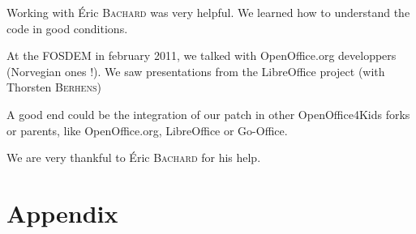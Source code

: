 \documentclass[a4paper,11pt]{article}
\begin{document}
Working with Éric \textsc{Bachard} was very helpful. We learned how to understand the code in good conditions.

At the FOSDEM in february 2011, we talked with OpenOffice.org developpers (Norvegian ones !). We saw presentations from the LibreOffice project (with Thorsten \textsc{Berhens})

A good end could be the integration of our patch in other OpenOffice4Kids forks or parents, like OpenOffice.org, LibreOffice or Go-Office.

We are very thankful to Éric \textsc{Bachard} for his help.

\newpage
{}
\listoffigures

\newpage
{}
\section*{Appendix}
\end{document}
